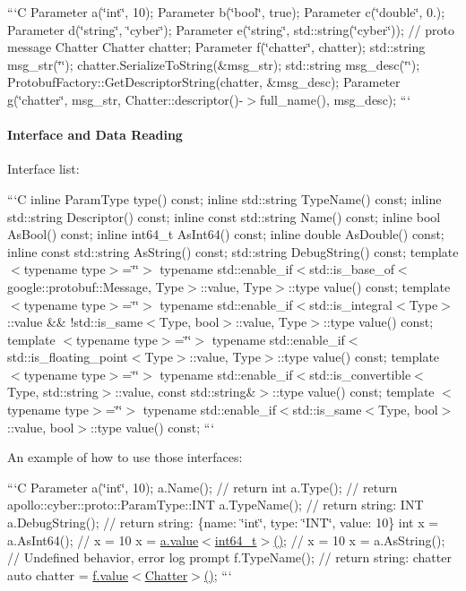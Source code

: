 ```\-C Parameter a(\char`\"{}int\char`\"{}, 10); Parameter b(\char`\"{}bool\char`\"{}, true); Parameter c(\char`\"{}double\char`\"{}, 0.); Parameter d(\char`\"{}string\char`\"{}, \char`\"{}cyber\char`\"{}); Parameter e(\char`\"{}string\char`\"{}, std\-::string(\char`\"{}cyber\char`\"{})); // proto message Chatter Chatter chatter; Parameter f(\char`\"{}chatter\char`\"{}, chatter); std\-::string msg\-\_\-str(\char`\"{}\char`\"{}); chatter.\-Serialize\-To\-String(\&msg\-\_\-str); std\-::string msg\-\_\-desc(\char`\"{}\char`\"{}); Protobuf\-Factory\-::\-Get\-Descriptor\-String(chatter, \&msg\-\_\-desc); Parameter g(\char`\"{}chatter\char`\"{}, msg\-\_\-str, Chatter\-::descriptor()-\/$>$full\-\_\-name(), msg\-\_\-desc); ```

\paragraph*{Interface and Data Reading}

Interface list\-:

```\-C inline Param\-Type type() const; inline std\-::string Type\-Name() const; inline std\-::string Descriptor() const; inline const std\-::string Name() const; inline bool As\-Bool() const; inline int64\-\_\-t As\-Int64() const; inline double As\-Double() const; inline const std\-::string As\-String() const; std\-::string Debug\-String() const; template $<$typename type$>$=\char`\"{}\char`\"{}$>$ typename std\-::enable\-\_\-if$<$std\-::is\-\_\-base\-\_\-of$<$google\-::protobuf\-::\-Message, Type$>$\-::value, Type$>$\-::type value() const; template $<$typename type$>$=\char`\"{}\char`\"{}$>$ typename std\-::enable\-\_\-if$<$std\-::is\-\_\-integral$<$\-Type$>$\-::value \&\& !std\-::is\-\_\-same$<$\-Type, bool$>$\-::value, Type$>$\-::type value() const; template $<$typename type$>$=\char`\"{}\char`\"{}$>$ typename std\-::enable\-\_\-if$<$std\-::is\-\_\-floating\-\_\-point$<$\-Type$>$\-::value, Type$>$\-::type value() const; template $<$typename type$>$=\char`\"{}\char`\"{}$>$ typename std\-::enable\-\_\-if$<$std\-::is\-\_\-convertible$<$\-Type, std\-::string$>$\-::value, const std\-::string\&$>$\-::type value() const; template $<$typename type$>$=\char`\"{}\char`\"{}$>$ typename std\-::enable\-\_\-if$<$std\-::is\-\_\-same$<$\-Type, bool$>$\-::value, bool$>$\-::type value() const; ```

An example of how to use those interfaces\-:

```\-C Parameter a(\char`\"{}int\char`\"{}, 10); a.\-Name(); // return int a.\-Type(); // return apollo\-::cyber\-::proto\-::\-Param\-Type\-::\-I\-N\-T a.\-Type\-Name(); // return string\-: I\-N\-T a.\-Debug\-String(); // return string\-: \{name\-: \char`\"{}int\char`\"{}, type\-: \char`\"{}\-I\-N\-T\char`\"{}, value\-: 10\} int x = a.\-As\-Int64(); // x = 10 x = \hyperlink{namespaceapollo_1_1cyber_1_1base_aa3e2fff9b18a1214af4a70546fb7120f}{a.\-value$<$int64\-\_\-t$>$()}; // x = 10 x = a.\-As\-String(); // Undefined behavior, error log prompt f.\-Type\-Name(); // return string\-: chatter auto chatter = \hyperlink{namespaceapollo_1_1cyber_1_1base_aa3e2fff9b18a1214af4a70546fb7120f}{f.\-value$<$\-Chatter$>$()}; ```

